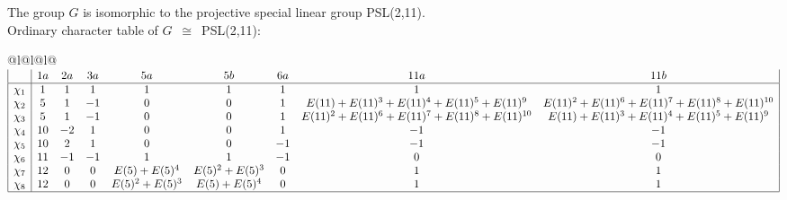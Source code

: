\documentclass[varwidth=\maxdimen,border=10]{standalone}
\begin{document}
The group $G$ is isomorphic to the projective special linear group PSL(2,11).\\
Ordinary character table of $G$\ $\cong$\ PSL(2,11):\\
\begin{center}
\begin{tabular}{@{}l@{}l@{}l@{}}
\hline
\(\begin{array}{|l|cccccccc|}
  & 1a & 2a & 3a & 5a & 5b & 6a & 11a & 11b\\ \hline
\chi_{1} & 1 & 1 & 1 & 1 & 1 & 1 & 1 & 1\\
\chi_{2} & 5 & 1 & -1 & 0 & 0 & 1 & E(11)+E(11)^{3}+E(11)^{4}+E(11)^{5}+E(11)^{9} & E(11)^{2}+E(11)^{6}+E(11)^{7}+E(11)^{8}+E(11)^{10}\\
\chi_{3} & 5 & 1 & -1 & 0 & 0 & 1 & E(11)^{2}+E(11)^{6}+E(11)^{7}+E(11)^{8}+E(11)^{10} & E(11)+E(11)^{3}+E(11)^{4}+E(11)^{5}+E(11)^{9}\\
\chi_{4} & 10 & -2 & 1 & 0 & 0 & 1 & -1 & -1\\
\chi_{5} & 10 & 2 & 1 & 0 & 0 & -1 & -1 & -1\\
\chi_{6} & 11 & -1 & -1 & 1 & 1 & -1 & 0 & 0\\
\chi_{7} & 12 & 0 & 0 & E(5)+E(5)^{4} & E(5)^{2}+E(5)^{3} & 0 & 1 & 1\\
\chi_{8} & 12 & 0 & 0 & E(5)^{2}+E(5)^{3} & E(5)+E(5)^{4} & 0 & 1 & 1\\
\hline
\end{array}\)\\
\end{tabular}
\end{center}
\end{document}
